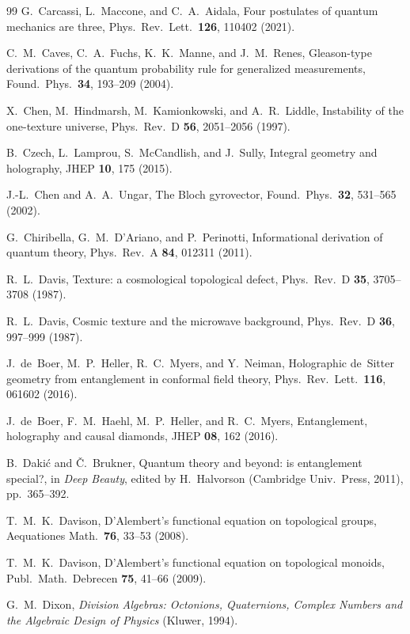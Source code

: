 \documentclass[aps,pra,onecolumn,superscriptaddress,nofootinbib,10pt]{revtex4-2}
\theoremstyle{definition}
\theoremstyle{remark}
\begin{document}
\begin{thebibliography}{99}
 G.~Carcassi, L.~Maccone, and C.~A.~Aidala, Four postulates of quantum mechanics are three, Phys.\ Rev.\ Lett.\ \textbf{126}, 110402 (2021).

 C.~M.~Caves, C.~A.~Fuchs, K.~K.~Manne, and J.~M.~Renes, Gleason-type derivations of the quantum probability rule for generalized measurements, Found.\ Phys.\ \textbf{34}, 193--209 (2004).

 X.~Chen, M.~Hindmarsh, M.~Kamionkowski, and A.~R.~Liddle, Instability of the one-texture universe, Phys.\ Rev.\ D \textbf{56}, 2051--2056 (1997).

 B.~Czech, L.~Lamprou, S.~McCandlish, and J.~Sully, Integral geometry and holography, JHEP \textbf{10}, 175 (2015).

 J.-L.~Chen and A.~A.~Ungar, The Bloch gyrovector, Found.\ Phys.\ \textbf{32}, 531--565 (2002).

 G.~Chiribella, G.~M.~D'Ariano, and P.~Perinotti, Informational derivation of quantum theory, Phys.\ Rev.\ A \textbf{84}, 012311 (2011).

 R.~L.~Davis, Texture: a cosmological topological defect, Phys.\ Rev.\ D \textbf{35}, 3705--3708 (1987).

 R.~L.~Davis, Cosmic texture and the microwave background, Phys.\ Rev.\ D \textbf{36}, 997--999 (1987).

 J.~de~Boer, M.~P.~Heller, R.~C.~Myers, and Y.~Neiman, Holographic de~Sitter geometry from entanglement in conformal field theory, Phys.\ Rev.\ Lett.\ \textbf{116}, 061602 (2016).

 J.~de~Boer, F.~M.~Haehl, M.~P.~Heller, and R.~C.~Myers, Entanglement, holography and causal diamonds, JHEP \textbf{08}, 162 (2016).

 B.~Daki\'c and \v{C}.~Brukner, Quantum theory and beyond: is entanglement special?, in \emph{Deep Beauty}, edited by H.~Halvorson (Cambridge Univ.\ Press, 2011), pp.~365--392.

 T.~M.~K.~Davison, D'Alembert's functional equation on topological groups, Aequationes Math.\ \textbf{76}, 33--53 (2008).

 T.~M.~K.~Davison, D'Alembert's functional equation on topological monoids, Publ.\ Math.\ Debrecen \textbf{75}, 41--66 (2009).

 G.~M.~Dixon, \emph{Division Algebras: Octonions, Quaternions, Complex Numbers and the Algebraic Design of Physics} (Kluwer, 1994).


\end{thebibliography}
\end{document}
